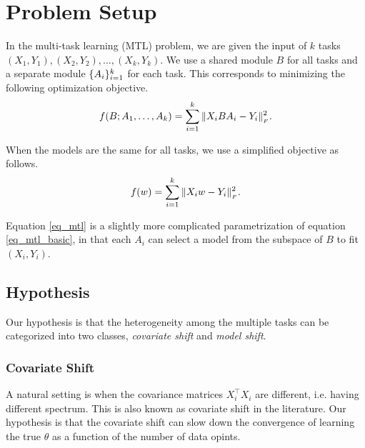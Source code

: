 \section{Problem Setup}\label{sec_setup}

In the multi-task learning (MTL) problem, we are given the input of $k$ tasks $(X_1, Y_1), (X_2, Y_2), \dots, (X_k, Y_k)$.
We use a shared module $B$ for all tasks and a separate module $\{A_i\}_{i=1}^k$ for each task.
This corresponds to minimizing the following optimization objective.
\begin{align}
	\label{eq_mtl}
	f(B; A_1, \dots, A_k) = \sum_{i=1}^k \|X_i B A_i - Y_i\|_{_{F}}^2.
\end{align}

When the models are the same for all tasks, we use a simplified objective as follows.
\begin{align}
	\label{eq_mtl_basic}
	f(w) = \sum_{i=1}^k \|X_i w - Y_i\|_{_{F}}^2.
\end{align}

Equation \eqref{eq_mtl} is a slightly more complicated parametrization of equation \eqref{eq_mtl_basic}, in that each $A_i$ can select a model from the subspace of $B$ to fit $(X_i, Y_i)$.


\subsection{Hypothesis}

Our hypothesis is that the heterogeneity among the multiple tasks can be categorized into two classes, \textit{covariate shift} and \textit{model shift}. 

\subsubsection{Covariate Shift}

A natural setting is when the covariance matrices $X_i^{\top} X_i$ are different, i.e. having different spectrum.
This is also known as covariate shift in the literature.
Our hypothesis is that the covariate shift can slow down the convergence of learning the true $\theta$ as a function of the number of data opints.


